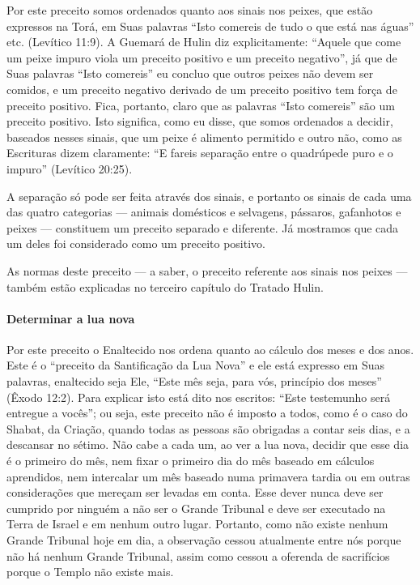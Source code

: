 Por este preceito somos ordenados quanto aos sinais nos peixes, que
estão expressos na Torá, em Suas palavras ``Isto comereis de tudo o que
está nas águas'' etc. (Levítico 11:9). A Guemará de Hulin diz
explicitamente: ``Aquele que come um peixe impuro viola um preceito
positivo e um preceito negativo'', já que de Suas palavras ``Isto
comereis'' eu concluo que outros peixes não devem ser comidos, e um
preceito negativo derivado de um preceito positivo tem força de preceito
positivo. Fica, portanto, claro que as palavras ``Isto comereis'' são
um preceito positivo. Isto significa, como eu disse, que somos
ordenados a decidir, baseados nesses sinais, que um peixe é alimento
permitido e outro não, como as Escrituras dizem claramente: ``E fareis
separação entre o quadrúpede puro e o impuro'' (Levítico 20:25).

A separação só pode ser feita através dos sinais, e portanto os sinais
de cada uma das quatro categorias --- animais domésticos e selvagens,
pássaros, gafanhotos e peixes --- constituem um preceito separado e
diferente. Já mostramos que cada um deles foi considerado como um
preceito positivo.

As normas deste preceito --- a saber, o preceito referente aos sinais
nos peixes --- também estão explicadas no terceiro capítulo do Tratado
Hulin.

\paragraph{Determinar a lua nova}

Por este preceito o Enaltecido nos ordena quanto ao cálculo dos meses e
dos anos. Este é o ``preceito da Santificação da Lua Nova'' e ele está
expresso em Suas palavras, enaltecido seja Ele, ``Este mês seja, para
vós, princípio dos meses'' (Êxodo 12:2). Para explicar isto está dito
nos escritos: ``Este testemunho será entregue a vocês''; ou seja, este preceito não é imposto a
todos, como é o caso do Shabat, da Criação, quando todas as pessoas são
obrigadas a contar seis dias, e a descansar no sétimo. Não cabe a cada
um, ao ver a lua nova, decidir que esse dia é o primeiro do mês, nem
fixar o primeiro dia do mês baseado em cálculos aprendidos, nem
intercalar um mês baseado numa primavera tardia ou em outras
considerações que mereçam ser levadas em conta. Esse dever nunca deve
ser cumprido por ninguém a não ser o Grande Tribunal e deve ser
executado na Terra de Israel e em nenhum outro lugar. Portanto, como
não existe nenhum Grande Tribunal hoje em dia, a observação cessou
atualmente entre nós porque não há nenhum Grande Tribunal, assim como
cessou a oferenda de sacrifícios porque o Templo não existe mais.

